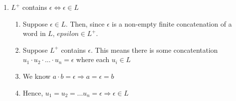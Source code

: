 \documentclass{article}
\begin{document}
\begin{enumerate}
\item $L^+$ contains $\epsilon \iff \epsilon \in L $
\begin{enumerate}
\item Suppose $\epsilon \in L$. Then, since $\epsilon$ is a non-empty finite
concatenation of a word in $L$, $epsilon \in L^+$.
\item Suppose $L^+$ contains $\epsilon$. This means there is some concatentation
$ u_1 \cdot u_2 \cdot ... \cdot u_n = \epsilon$ where each $u_i \in L$
\item We know $a \cdot b = \epsilon \Rightarrow a = \epsilon = b$
\item Hence, $u_1 = u_2 = ... u_n = \epsilon \Rightarrow \epsilon \in L$
\end{enumerate}
\end{enumerate}
\end{document}
